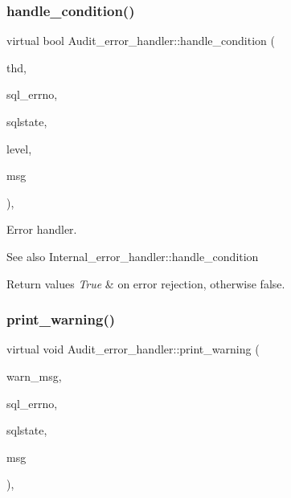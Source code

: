 \mbox{\label{classAudit__error__handler_a5b6e8df5f80e0b00026eb90f90622657}} 
\subsubsection{\texorpdfstring{handle\+\_\+condition()}{handle\_condition()}}
{\footnotesize\ttfamily virtual bool Audit\+\_\+error\+\_\+handler\+::handle\+\_\+condition (\begin{DoxyParamCaption}\item[{T\+HD $\ast$}]{thd,  }\item[{uint}]{sql\+\_\+errno,  }\item[{const char $\ast$}]{sqlstate,  }\item[{\mbox{\hyperlink{classSql__condition_ab0602581e19cddb609bfe10c44be4e83}{Sql\+\_\+condition\+::enum\+\_\+severity\+\_\+level}} $\ast$}]{level,  }\item[{const char $\ast$}]{msg }\end{DoxyParamCaption})\hspace{0.3cm}{\ttfamily [inline]}, {\ttfamily [virtual]}}



Error handler. 

\begin{DoxySeeAlso}{See also}
Internal\+\_\+error\+\_\+handler\+::handle\+\_\+condition
\end{DoxySeeAlso}

\begin{DoxyRetVals}{Return values}
{\em True} & on error rejection, otherwise false. \\
\hline
\end{DoxyRetVals}
\mbox{\label{classAudit__error__handler_ac3b06f010e4c72aee47ae6123e49ecc4}} 
\subsubsection{\texorpdfstring{print\+\_\+warning()}{print\_warning()}}
{\footnotesize\ttfamily virtual void Audit\+\_\+error\+\_\+handler\+::print\+\_\+warning (\begin{DoxyParamCaption}\item[{const char $\ast$}]{warn\+\_\+msg,  }\item[{uint}]{sql\+\_\+errno,  }\item[{const char $\ast$}]{sqlstate,  }\item[{const char $\ast$}]{msg }\end{DoxyParamCaption})\hspace{0.3cm}{\ttfamily [inline]}, {\ttfamily [virtual]}}




